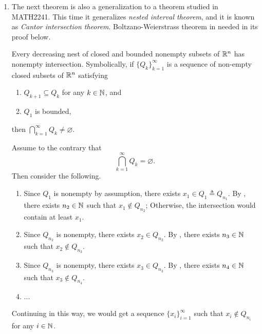\begin{enumerate}
\item The next theorem is also a generalization to a theorem studied in
MATH2241. This time it generalizes \emph{nested interval theorem}, and it is
known as \emph{Cantor intersection theorem}. Boltzano-Weierstrass theorem in
needed in its proof below.
\begin{theorem}
\label{thm:cantor-intersection}
Every decreasing nest of closed and bounded nonempty subsets of \(\mathbb{R}^n\) has
nonempty intersection. Symbolically, if \(\{Q_k\}_{k=1}^{\infty}\) is a
sequence of non-empty closed subsets of \(\mathbb{R}^n\) satisfying
\begin{enumerate}
\item \(Q_{k+1}\subseteq Q_k\) for any \(k\in\mathbb{N}\), and
\item \(Q_1\) is bounded,
\end{enumerate}
then \(\displaystyle \bigcap_{k=1}^{\infty}Q_k\ne\varnothing\).
\end{theorem}
\begin{pf}
Assume to the contrary that 
\begin{equation}
\label{eq:cantor-int-contrary-assum}
\bigcap_{k=1}^{\infty}Q_k=\varnothing.
\end{equation}
Then consider the following.
\begin{enumerate}[label={(\arabic*)}]
\item Since \(Q_1\) is nonempty by assumption, there exists \(x_1\in Q_1\triangleq Q_{n_1}\). By
, there exists \(n_2\in\mathbb{N}\) such that \(x_1\notin
Q_{n_2}\); Otherwise, the intersection would contain at least \(x_1\).
\item Since \(Q_{n_2}\) is nonempty, there exists \(x_2\in Q_{n_2}\).
By , there exists \(n_3\in\mathbb{N}\) such that
\(x_2\notin Q_{n_3}\).
\item Since \(Q_{n_3}\) is nonempty, there exists \(x_3\in Q_{n_3}\).
By , there exists \(n_4\in\mathbb{N}\) such that
\(x_3\notin Q_{n_4}\).
\item ...
\end{enumerate}
Continuing in this way, we would get a sequence \(\{x_i\}_{i=1}^{\infty}\) such
that \(x_i\notin Q_{n_i}\) for any \(i\in\mathbb{N}\).
\begin{center}
\end{center}
\end{pf}
\end{enumerate}
